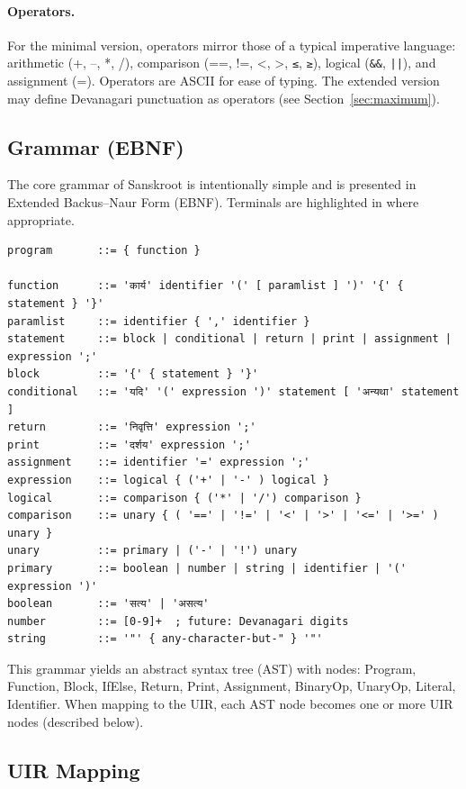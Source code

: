 \documentclass[12pt]{article}
\begin{document}
\paragraph{Operators.} For the minimal version, operators mirror those of a
typical imperative language: arithmetic (+, –, *, /), comparison (==, !=,
<, >, \texttt{≤}, \texttt{≥}), logical (\texttt{\&\&}, \texttt{||}), and
assignment (=).  Operators are ASCII for ease of typing.  The extended
version may define Devanagari punctuation as operators (see
Section~\ref{sec:maximum}).

\subsection{Grammar (EBNF)}

The core grammar of Sanskroot is intentionally simple and is presented in
Extended Backus–Naur Form (EBNF).  Terminals are highlighted in
 where appropriate.

\begin{verbatim}
program       ::= { function }

function      ::= 'कार्य' identifier '(' [ paramlist ] ')' '{' { statement } '}'
paramlist     ::= identifier { ',' identifier }
statement     ::= block | conditional | return | print | assignment | expression ';'
block         ::= '{' { statement } '}'
conditional   ::= 'यदि' '(' expression ')' statement [ 'अन्यथा' statement ]
return        ::= 'निवृत्ति' expression ';'
print         ::= 'दर्शय' expression ';'
assignment    ::= identifier '=' expression ';'
expression    ::= logical { ('+' | '-' ) logical }
logical       ::= comparison { ('*' | '/') comparison }
comparison    ::= unary { ( '==' | '!=' | '<' | '>' | '<=' | '>=' ) unary }
unary         ::= primary | ('-' | '!') unary
primary       ::= boolean | number | string | identifier | '(' expression ')'
boolean       ::= 'सत्य' | 'असत्य'
number        ::= [0-9]+  ; future: Devanagari digits
string        ::= '"' { any-character-but-" } '"'
\end{verbatim}

This grammar yields an abstract syntax tree (AST) with nodes: Program,
Function, Block, IfElse, Return, Print, Assignment, BinaryOp, UnaryOp,
Literal, Identifier.  When mapping to the UIR, each AST node becomes one or
more UIR nodes (described below).

\subsection{UIR Mapping}
\end{document}
